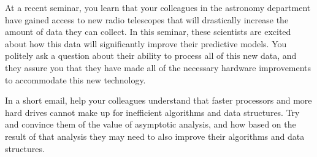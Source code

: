 \documentclass[12pt]{article}
\begin{document}
\renewcommand{\headrulewidth}{0.5pt}

\phantom{Test}

At a recent seminar, you learn that your colleagues in the astronomy department
have gained access to new radio telescopes that will drastically increase the
amount of data they can collect. In this seminar, these scientists are excited
about how this data will significantly improve their predictive models. You
politely ask a question about their ability to process all of this new data,
and they assure you that they have made all of the necessary hardware
improvements to accommodate this new technology.

In a short email, help your colleagues understand that faster processors and
more hard drives cannot make up for inefficient algorithms and data structures.
Try and convince them of the value of asymptotic analysis, and how based on the
result of that analysis they may need to also improve their algorithms and data
structures.


\pagebreak
\end{document}
